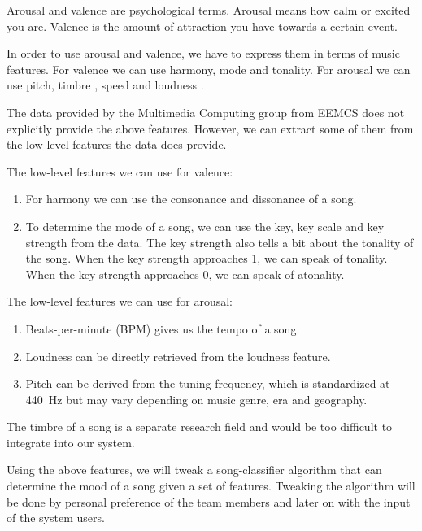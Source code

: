 Arousal and valence are psychological terms\cite{Thayer}.
Arousal means how calm or excited you are.
Valence is the amount of attraction you have towards a certain event.

In order to use arousal and valence, we have to express them in terms of music features.
For valence we can use harmony, mode and tonality\cite{DianaDeutsch}.
For arousal we can use pitch, timbre \cite{Liu03automaticmood}, speed and loudness \cite{PresentationMER}\cite{PaperME}.

\newpage

The data provided by the Multimedia Computing group from EEMCS does not explicitly provide the above features.
However, we can extract some of them from the low-level features the data does provide.

The low-level features we can use for valence:
\begin{enumerate}
\item For harmony we can use the consonance and dissonance of a song.
\item To determine the mode of a song, we can use the key, key scale and key strength from the data.
The key strength also tells a bit about the tonality of the song.
When the key strength approaches 1, we can speak of tonality. When the key strength approaches 0, we can speak of atonality.
\end{enumerate}
The low-level features we can use for arousal:
\begin{enumerate}
\item Beats-per-minute (BPM) gives us the tempo of a song.
\item Loudness can be directly retrieved from the loudness feature.
\item Pitch can be derived from the tuning frequency, which is standardized at \SI{440}{\hertz} but may vary depending on music genre, era and geography.
\end{enumerate}

The timbre of a song is a separate research field and would be too difficult to integrate into our system.

Using the above features, we will tweak a song-classifier algorithm that can determine the mood of a song given a set of features.
Tweaking the algorithm will be done by personal preference of the team members and later on with the input of the system users.

